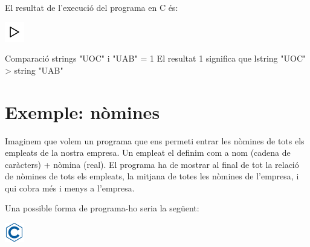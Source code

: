 \documentclass[]{book}
\newenvironment{Shaded}{\begin{snugshade}}{\end{snugshade}}
\newcommand{\DecValTok}[1]{\textcolor[rgb]{0.00,0.00,0.81}{#1}}
\newcommand{\NormalTok}[1]{#1}
\newcommand{\StringTok}[1]{\textcolor[rgb]{0.31,0.60,0.02}{#1}}
\begin{document}
El resultat de l'execució del programa en C és:

\includegraphics{./img/play.png}

\begin{Shaded}
\begin{Highlighting}[]
\NormalTok{Comparació strings }\StringTok{"UOC"}\NormalTok{ i }\StringTok{"UAB"}\NormalTok{ = }\DecValTok{1}
\NormalTok{El resultat }\DecValTok{1}\NormalTok{ significa que l\textquotesingle{}string }\StringTok{"UOC"}\NormalTok{ \textgreater{} string }\StringTok{"UAB"}
\end{Highlighting}
\end{Shaded}

\hypertarget{exemple-nomines}{%
\section{Exemple: nòmines}\label{exemple-nomines}}

Imaginem que volem un programa que ens permeti entrar les nòmines de tots els empleats de la nostra empresa. Un empleat el definim com a nom (cadena de caràcters) + nòmina (real). El programa ha de mostrar al final de tot la relació de nòmines de tots els empleats, la mitjana de totes les nòmines de l'empresa, i qui cobra més i menys a l'empresa.

Una possible forma de programa-ho seria la següent:

\includegraphics{./img/c.png}
\end{document}
